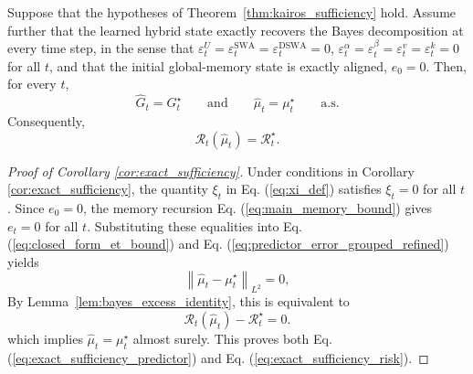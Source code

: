 \documentclass{llmxive}
\providecommand{\norm}[1]{\left\lVert #1 \right\rVert}
\begin{document}
\begin{corollary}
\label{cor:exact_sufficiency}
Suppose that the hypotheses of Theorem~\ref{thm:kairos_sufficiency} hold. Assume further that the learned hybrid state exactly recovers the Bayes decomposition at every time step, in the sense that $\varepsilon_t^U
=
\varepsilon_t^{\mathrm{SWA}}
=
\varepsilon_t^{\mathrm{DSWA}}
=
0$, $\varepsilon_t^\alpha
=
\varepsilon_t^\beta
=
\varepsilon_t^v
=
\varepsilon_t^k
=
0$
for all  $t$, and that the initial global-memory state is exactly aligned, $e_0 = 0$.
Then, for every $t$,
\begin{equation}
\hat G_t = G_t^\star
\qquad\text{and}\qquad
\hat\mu_t = \mu_t^\star
\qquad \text{a.s.}
\label{eq:exact_sufficiency_predictor}
\end{equation}
Consequently,
\begin{equation}
\mathcal R_t(\hat\mu_t)=\mathcal R_t^\star.
\label{eq:exact_sufficiency_risk}
\end{equation}
\end{corollary}







\begin{proof}[Proof of Corollary \ref{cor:exact_sufficiency}]
Under conditions in  Corollary \ref{cor:exact_sufficiency}, the quantity $\xi_t$ in Eq. (\ref{eq:xi_def}) satisfies $\xi_t = 0$ for all $t$. Since $e_0=0$, the memory recursion Eq. (\ref{eq:main_memory_bound}) gives $e_t=0$ for all $t$. Substituting these equalities into Eq. (\ref{eq:closed_form_et_bound}) and Eq. (\ref{eq:predictor_error_grouped_refined}) yields
\[
\norm{\hat\mu_t-\mu_t^\star}_{L^2} = 0,
\]
By Lemma~\ref{lem:bayes_excess_identity}, this is equivalent to
\[
\mathcal R_t(\hat\mu_t)-\mathcal R_t^\star = 0.
\]
which implies $\hat\mu_t=\mu_t^\star$ almost surely. This proves both Eq. (\ref{eq:exact_sufficiency_predictor}) and Eq. (\ref{eq:exact_sufficiency_risk}).
\end{proof}
\end{document}

